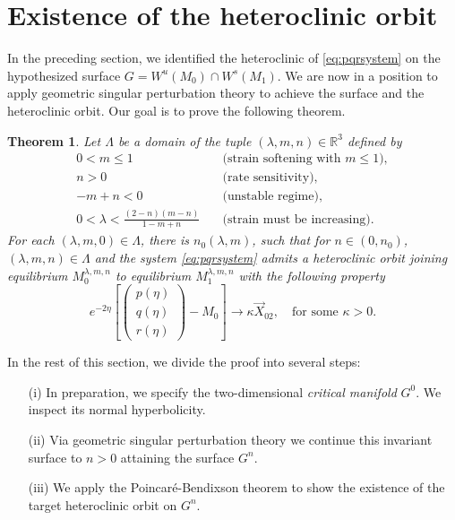 \documentclass[a4paper,11pt]{article}
\def\red{\color{red}}
\def\red{\color{red}}
\newtheorem{theorem}{Theorem}
\numberwithin{step}{dummy}
\begin{document}
%
%
%


\section{Existence of the heteroclinic orbit} \label{sec:proof}
In the preceding section, we identified the heteroclinic of \eqref{eq:pqrsystem} on the hypothesized surface $G = W^u(M_0) \cap W^s(M_1)$. We are now in a position to apply geometric singular perturbation theory to achieve the surface and the heteroclinic orbit. Our goal is to prove the following theorem.
\begin{theorem}\label{thm:1} Let $\Lambda$ be a domain of the tuple $(\lambda,m,n)\in\mathbb{R}^3$ defined by %
 \begin{align}
  0< m \le 1 \quad&\text{(strain softening with $m \le 1$)}, \label{eq:a1}\\
  n>0 \quad&\text{(rate sensitivity)}, \label{eq:a2}\\
  -m+n<0 \quad&\text{(unstable regime)}, \label{eq:a3}\\
  0< \lambda < \frac{(2-n)(m-n)}{1-m+n} \quad&\text{(strain must be increasing)}. \label{eq:a4}
\end{align}
 For each $(\lambda,m,0) \in \Lambda$, there is $n_0( \lambda,m)$, such that for $n \in (0, n_0)$, $(\lambda,m,n) \in \Lambda$ and the system \eqref{eq:pqrsystem} admits a heteroclinic orbit joining equilibrium $M_0^{\lambda,m,n}$ to equilibrium $M_1^{\lambda,m,n}$ with the following property
 \begin{equation} 
     e^{-2\eta}\left[\begin{pmatrix}
   p(\eta) \\ q(\eta) \\ r(\eta)
  \end{pmatrix}
  - M_0\right] \rightarrow \kappa\vec{X}_{02}, \quad \text{for some $\kappa>0$}. \label{eq:a5}
 \end{equation}
\end{theorem}
In the rest of this section, we divide the proof into several steps:
\begin{enumerate}
 \item[(i)] In preparation, we specify the two-dimensional {\it critical manifold} $G^0$. We inspect its normal hyperbolicity.
 \item[(ii)] Via geometric singular perturbation theory we continue this invariant surface to $n>0$ attaining the surface $G^n$. 
 \item[(iii)] We apply the Poincar\'e-Bendixson theorem to show the existence of the target heteroclinic orbit on $G^n$.
\end{enumerate}
\end{document}

